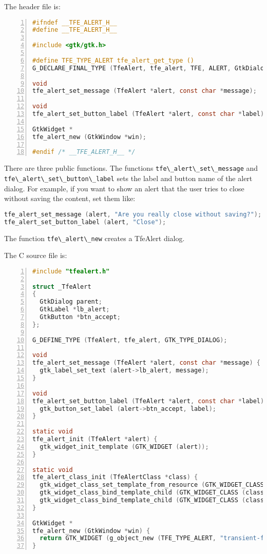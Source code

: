 The header file is:

\begin{lstlisting}[language=C, numbers=left]
#ifndef __TFE_ALERT_H__
#define __TFE_ALERT_H__

#include <gtk/gtk.h>

#define TFE_TYPE_ALERT tfe_alert_get_type ()
G_DECLARE_FINAL_TYPE (TfeAlert, tfe_alert, TFE, ALERT, GtkDialog)

void
tfe_alert_set_message (TfeAlert *alert, const char *message);

void
tfe_alert_set_button_label (TfeAlert *alert, const char *label);

GtkWidget *
tfe_alert_new (GtkWindow *win);

#endif /* __TFE_ALERT_H__ */
\end{lstlisting}

There are three public functions. The functions
\passthrough{\lstinline!tfe\_alert\_set\_message!} and
\passthrough{\lstinline!tfe\_alert\_set\_button\_label!} sets the label
and button name of the alert dialog. For example, if you want to show an
alert that the user tries to close without saving the content, set them
like:

\begin{lstlisting}[language=C]
tfe_alert_set_message (alert, "Are you really close without saving?"); /* alert points to a TfeAlert instance */
tfe_alert_set_button_label (alert, "Close");
\end{lstlisting}

The function \passthrough{\lstinline!tfe\_alert\_new!} creates a
TfeAlert dialog.

The C source file is:

\begin{lstlisting}[language=C, numbers=left]
#include "tfealert.h"

struct _TfeAlert
{
  GtkDialog parent;
  GtkLabel *lb_alert;
  GtkButton *btn_accept;
};

G_DEFINE_TYPE (TfeAlert, tfe_alert, GTK_TYPE_DIALOG);

void
tfe_alert_set_message (TfeAlert *alert, const char *message) {
  gtk_label_set_text (alert->lb_alert, message);
}

void
tfe_alert_set_button_label (TfeAlert *alert, const char *label) {
  gtk_button_set_label (alert->btn_accept, label);
}

static void
tfe_alert_init (TfeAlert *alert) {
  gtk_widget_init_template (GTK_WIDGET (alert));
}

static void
tfe_alert_class_init (TfeAlertClass *class) {
  gtk_widget_class_set_template_from_resource (GTK_WIDGET_CLASS (class), "/com/github/ToshioCP/tfe/tfealert.ui");
  gtk_widget_class_bind_template_child (GTK_WIDGET_CLASS (class), TfeAlert, lb_alert);
  gtk_widget_class_bind_template_child (GTK_WIDGET_CLASS (class), TfeAlert, btn_accept);
}

GtkWidget *
tfe_alert_new (GtkWindow *win) {
  return GTK_WIDGET (g_object_new (TFE_TYPE_ALERT, "transient-for", win, NULL));
}
\end{lstlisting}

